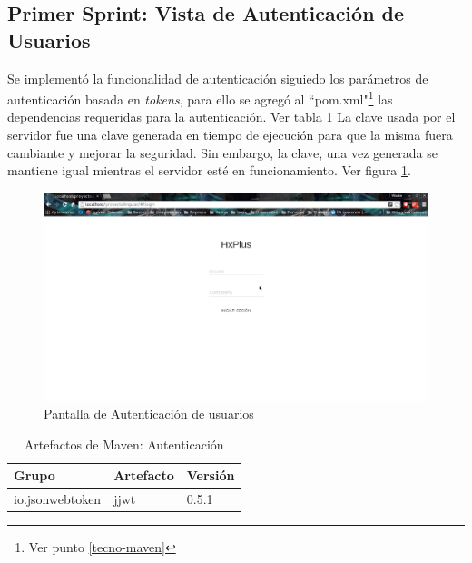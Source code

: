     \subsection{Primer Sprint: Vista de Autenticación de Usuarios}
    Se implementó la funcionalidad de autenticación siguiedo los parámetros de autenticación basada en \textit{tokens}, para ello se agregó al ``pom.xml"\footnote{Ver punto \ref{tecno-maven}} las dependencias requeridas para la autenticación. Ver tabla \ref{artefactos-tba}
    La clave usada por el servidor fue una clave generada en tiempo de ejecución para que la misma fuera cambiante y mejorar la seguridad. Sin embargo, la clave, una vez generada se mantiene igual mientras el servidor esté en funcionamiento. Ver figura \ref{Autenticación}.
    
    \begin{figure}[htbp!]
        \begin{center}
            \includegraphics[width=.9\textwidth]{figures/p1}
        \end{center}
        \caption{Pantalla de Autenticación de usuarios}
        \label{Autenticación}
    \end{figure}
    
    \begin{table}[h!]
        
        \begin{center}
            \begin{tabular}{|l|l|l|}\hline
                Grupo & Artefacto & Versión \\\hline
                io.jsonwebtoken & jjwt & 0.5.1 \\\hline
            \end{tabular}
        \end{center}
        
        \caption{Artefactos de Maven: Autenticación}
        \label{artefactos-tba}
    \end{table}
    
